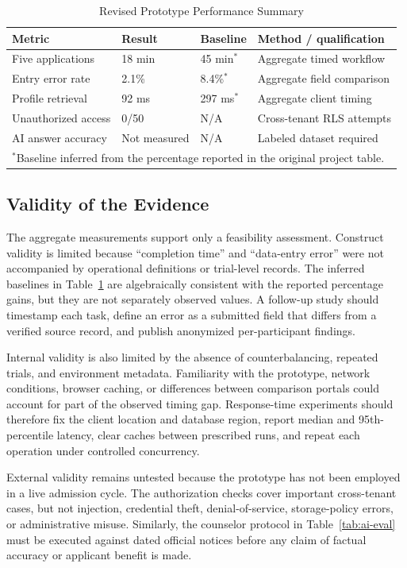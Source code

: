 \documentclass[conference,letterpaper]{IEEEtran}
\begin{document}
\begin{table}[!t]
\caption{Revised Prototype Performance Summary}
\label{tab:performance}
\centering\scriptsize
\setlength{\tabcolsep}{1.8pt}\renewcommand{\arraystretch}{1.03}
\begin{tabularx}{\columnwidth}{@{}X l l X@{}}
\toprule
Metric & Result & Baseline & Method / qualification\\
\midrule
Five applications & 18 min & 45 min$^*$ & Aggregate timed workflow\\
Entry error rate & 2.1\% & 8.4\%$^*$ & Aggregate field comparison\\
Profile retrieval & 92 ms & 297 ms$^*$ & Aggregate client timing\\
Unauthorized access & 0/50 & N/A & Cross-tenant RLS attempts\\
AI answer accuracy & Not measured & N/A & Labeled dataset required\\
\bottomrule
\multicolumn{4}{l}{\scriptsize $^*$Baseline inferred from the percentage reported in the original project table.}
\end{tabularx}
\end{table}

\subsection{Validity of the Evidence}
The aggregate measurements support only a feasibility assessment. Construct validity is limited because “completion time” and “data-entry error” were not accompanied by operational definitions or trial-level records. The inferred baselines in Table~\ref{tab:performance} are algebraically consistent with the reported percentage gains, but they are not separately observed values. A follow-up study should timestamp each task, define an error as a submitted field that differs from a verified source record, and publish anonymized per-participant findings.

Internal validity is also limited by the absence of counterbalancing, repeated trials, and environment metadata. Familiarity with the prototype, network conditions, browser caching, or differences between comparison portals could account for part of the observed timing gap. Response-time experiments should therefore fix the client location and database region, report median and 95th-percentile latency, clear caches between prescribed runs, and repeat each operation under controlled concurrency.

External validity remains untested because the prototype has not been employed in a live admission cycle. The authorization checks cover important cross-tenant cases, but not injection, credential theft, denial-of-service, storage-policy errors, or administrative misuse. Similarly, the counselor protocol in Table~\ref{tab:ai-eval} must be executed against dated official notices before any claim of factual accuracy or applicant benefit is made.
\end{document}
